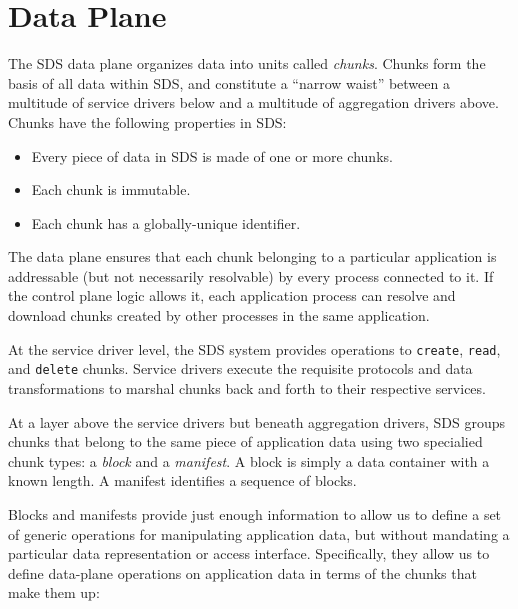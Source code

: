 \section{Data Plane}

The SDS data plane organizes data into units called \emph{chunks}.  Chunks form
the basis of all data within SDS, and constitute a ``narrow waist'' between 
a multitude of service drivers below and a multitude of aggregation drivers
above.  Chunks have the following properties in SDS:

\begin{itemize}
    \item Every piece of data in SDS is made of one or more chunks.
    \item Each chunk is immutable.
    \item Each chunk has a globally-unique identifier.
\end{itemize}

The data plane ensures that each chunk belonging to a particular application
is addressable (but not necessarily resolvable) by every process connected to it.
If the control plane logic allows it, each application
process can resolve and download chunks created by other processes in the same
application.


At the service driver level, the SDS
system provides operations to \texttt{create}, \texttt{read}, and
\texttt{delete} chunks.  Service drivers execute the requisite protocols
and data transformations to
marshal chunks back and forth to their respective services.

At a layer above the service drivers but beneath aggregation drivers, SDS
groups chunks that belong to the same piece of application data using two specialied
chunk types:  a \emph{block} and a \emph{manifest}.  A block is simply a data
container with a known length.  A manifest identifies a sequence of blocks.

Blocks and manifests provide just enough information to allow us to define a
set of generic operations for manipulating application data, but
without mandating a particular data representation or access interface.
Specifically, they allow us to define data-plane operations on
application data in terms of the chunks that make them up:

